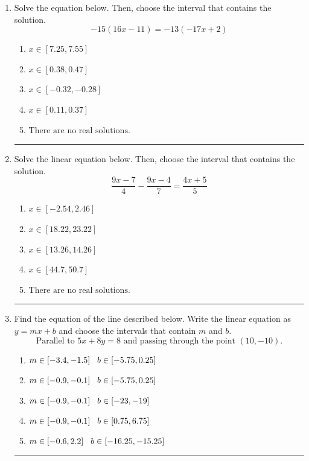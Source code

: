 \documentclass[14pt]{extbook}
\newcommand{\litem}[1]{\item#1\hspace*{-1cm}\rule{\textwidth}{0.4pt}}
\begin{document}
\begin{enumerate}
\litem{
Solve the equation below. Then, choose the interval that contains the solution.\[ -15(16x -11) = -13(-17x + 2) \]\begin{enumerate}[label=\Alph*.]
\item \( x \in [7.25, 7.55] \)
\item \( x \in [0.38, 0.47] \)
\item \( x \in [-0.32, -0.28] \)
\item \( x \in [0.11, 0.37] \)
\item \( \text{There are no real solutions.} \)

\end{enumerate} }
\litem{
Solve the linear equation below. Then, choose the interval that contains the solution.\[ \frac{9x -7}{4} - \frac{9x -4}{7} = \frac{4x + 5}{5} \]\begin{enumerate}[label=\Alph*.]
\item \( x \in [-2.54, 2.46] \)
\item \( x \in [18.22, 23.22] \)
\item \( x \in [13.26, 14.26] \)
\item \( x \in [44.7, 50.7] \)
\item \( \text{There are no real solutions.} \)

\end{enumerate} }
\litem{
Find the equation of the line described below. Write the linear equation as $ y=mx+b $ and choose the intervals that contain $m$ and $b$.\[ \text{Parallel to } 5 x + 8 y = 8 \text{ and passing through the point } (10, -10). \]\begin{enumerate}[label=\Alph*.]
\item \( m \in [-3.4, -1.5] \hspace*{3mm} b \in [-5.75, 0.25] \)
\item \( m \in [-0.9, -0.1] \hspace*{3mm} b \in [-5.75, 0.25] \)
\item \( m \in [-0.9, -0.1] \hspace*{3mm} b \in [-23, -19] \)
\item \( m \in [-0.9, -0.1] \hspace*{3mm} b \in [0.75, 6.75] \)
\item \( m \in [-0.6, 2.2] \hspace*{3mm} b \in [-16.25, -15.25] \)


\end{enumerate}}
\end{enumerate}
\end{document}
